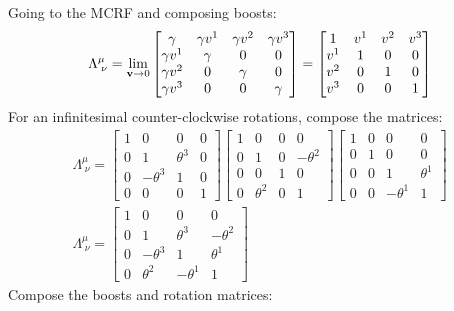 \documentclass{report}
\theoremstyle{definition}
\begin{document}
\begin{chapter9}
	Going to the MCRF and composing boosts:
	\begin{gather*}
		\Lambda^{\mu}_{\;\nu} = \lim_{{\bf v}\to 0}\begin{bmatrix}
			\gamma & \gamma v^1 & \gamma v^2 & \gamma v^3 \\
			\gamma v^1 & \gamma & 0 & 0 \\
			\gamma v^2 & 0 & \gamma & 0 \\
			\gamma v^3 & 0 & 0 & \gamma
		\end{bmatrix} = \begin{bmatrix}
			1 &  v^1 &  v^2 &  v^3 \\
			v^1 & 1 & 0 & 0 \\
			v^2 & 0 & 1 & 0 \\
			v^3 & 0 & 0 & 1
		\end{bmatrix}
	\end{gather*}
	For an infinitesimal counter-clockwise rotations, compose the matrices:
	\begin{gather*}
		\Lambda^{\mu}_{\;\nu} = \begin{bmatrix}
			1 & 0 & 0 & 0 \\
			0 & 1 & \theta^3 & 0 \\
			0 & -\theta^3 & 1 & 0\\
			0 & 0 & 0 & 1
		\end{bmatrix}
		\begin{bmatrix}
			1 & 0 & 0 & 0 \\
			0 & 1 & 0 & -\theta^2 \\
			0 & 0 & 1 & 0 \\
			0 & \theta^2 & 0 & 1
		\end{bmatrix}
		\begin{bmatrix}
			1 & 0 & 0 & 0 \\
			0 & 1 & 0 & 0 \\
			0 & 0 & 1 & \theta^1 \\
			0 & 0 & -\theta^1 & 1
		\end{bmatrix} \\
		\Lambda^{\mu}_{\;\nu} = \begin{bmatrix}
			1 & 0 & 0 & 0 \\
			0 & 1 & \theta^3 & -\theta^2 \\
			0 & -\theta^3 & 1 & \theta^1 \\
			0 & \theta^2 & -\theta^1 & 1
		\end{bmatrix}
	\end{gather*}
	Compose the boosts and rotation matrices:

\end{chapter9}
\end{document}
